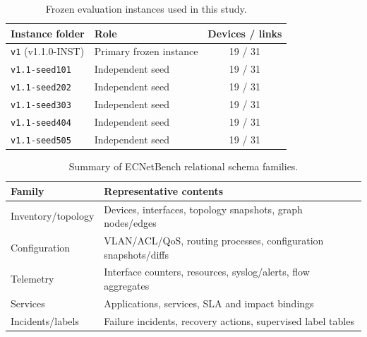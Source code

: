 \begin{table}[!t]
\centering
\caption{Frozen evaluation instances used in this study.}
\label{tab:seeds}
\renewcommand{\arraystretch}{1.15}
{\footnotesize\begin{tabular}{llc}
\toprule
Instance folder & Role & Devices / links \\
\midrule
\texttt{v1} (v1.1.0-INST) & Primary frozen instance & 19 / 31 \\
\texttt{v1.1-seed101} & Independent seed & 19 / 31 \\
\texttt{v1.1-seed202} & Independent seed & 19 / 31 \\
\texttt{v1.1-seed303} & Independent seed & 19 / 31 \\
\texttt{v1.1-seed404} & Independent seed & 19 / 31 \\
\texttt{v1.1-seed505} & Independent seed & 19 / 31 \\
\bottomrule
\end{tabular}}
\end{table}

\begin{table}[!t]
\centering
\caption{Summary of ECNetBench relational schema families.}
\label{tab:schema}
\renewcommand{\arraystretch}{1.15}
{\footnotesize\begin{tabular}{p{2.4cm}p{5.3cm}}
\toprule
Family & Representative contents \\
\midrule
Inventory/topology & Devices, interfaces, topology snapshots, graph nodes/edges \\
Configuration & VLAN/ACL/QoS, routing processes, configuration snapshots/diffs \\
Telemetry & Interface counters, resources, syslog/alerts, flow aggregates \\
Services & Applications, services, SLA and impact bindings \\
Incidents/labels & Failure incidents, recovery actions, supervised label tables \\
\bottomrule
\end{tabular}}
\end{table}
